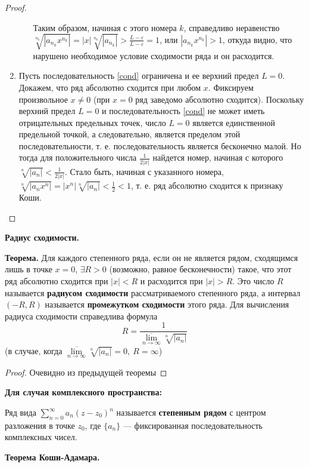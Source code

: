 \begin{proof}
\begin{enumerate}
\begin{itemize}
        Таким образом, начиная с этого номера $k$, справедливо неравенство $\sqrt[n_k]{|a_{n_k}x^{n_k}|}=|x|\sqrt[n_k]{|a_{n_k}|}>\frac{L-\varepsilon}{L-\varepsilon}=1$, или $|a_{n_k}x^{n_k}| > 1$, откуда видно, что нарушено необходимое условие сходимости ряда и он расходится.
    \end{itemize}
    \item Пусть последовательность \ref{cond} ограничена и ее верхний предел $L = 0$.
    Докажем, что ряд абсолютно сходится при любом $x$.
    Фиксируем произвольное $x\neq 0$ (при $x = 0$ ряд заведомо абсолютно сходится). Поскольку верхний предел $L = 0$ и последовательность \ref{cond} не может иметь отрицательных предельных точек, число $L = 0$ является единственной предельной точкой, а следовательно, является пределом этой последовательности, т. е. последовательность является бесконечно малой.
    Но тогда для положительного числа $\frac{1}{2|x|}$ найдется номер, начиная с которого $\sqrt[n]{|a_n|} < \frac{1}{2|x|}$.
    Стало быть, начиная с указанного номера, $\sqrt[n]{|a_n x^n|}=|x^n|\sqrt[n]{|a_n|}<\frac{1}{2}<1$, т. е. ряд абсолютно сходится к признаку Коши.
\end{enumerate}
\end{proof}


\textbf{Радиус сходимости.}

\textbf{Теорема.} Для каждого степенного ряда, если он не является рядом, сходящимся лишь в точке $x = 0$, $\exists R > 0$ (возможно, равное бесконечности) такое, что этот ряд абсолютно сходится при $|x| < R$ и расходится при $|x| > R$.
Это число $R$ называется \textbf{радиусом сходимости} рассматриваемого степенного ряда, 
а интервал $(-R, R)$ называется \textbf{промежутком сходимости} этого ряда.
Для вычисления радиуса сходимости справедлива формула
$$R=\frac{1}{\overline{\lim\limits_{n\to\infty}}\sqrt[n]{|a_n|}}$$
(в случае, когда $\overline{\lim\limits_{n\to\infty}}\sqrt[n]{|a_n|} = 0,~R = \infty$)

\begin{proof}
Очевидно из предыдущей теоремы
\end{proof}

\textbf{Для случая комплексного пространства:}

Ряд вида $\displaystyle\sum_{n=0}^{\infty}a_n(z-z_0)^n$ называется \textbf{степенным рядом} с центром разложения в точке $z_0$, где $\{a_n\}$ --- фиксированная последовательность комплексных чисел.

\textbf{Теорема Коши-Адамара.} 

